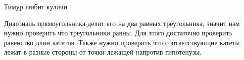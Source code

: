 \begin{tutorial}{Тимур любит куличи}

Диагональ прямоугольника делит его на два равных треугольника, значит нам нужно проверить что треугольники равны. Для этого достаточно проверить равенство длин катетов. Также нужно проверить что соответствующие катеты лежат в разные стороны от точки лежащей напротив гипотенузы.

\end{tutorial}
